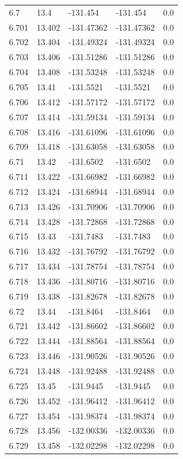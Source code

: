 \begin{tabular}{lllll}
6.7 & 13.4 & -131.454 & -131.454 & 0.0 \\
6.701 & 13.402 & -131.47362 & -131.47362 & 0.0 \\
6.702 & 13.404 & -131.49324 & -131.49324 & 0.0 \\
6.703 & 13.406 & -131.51286 & -131.51286 & 0.0 \\
6.704 & 13.408 & -131.53248 & -131.53248 & 0.0 \\
6.705 & 13.41 & -131.5521 & -131.5521 & 0.0 \\
6.706 & 13.412 & -131.57172 & -131.57172 & 0.0 \\
6.707 & 13.414 & -131.59134 & -131.59134 & 0.0 \\
6.708 & 13.416 & -131.61096 & -131.61096 & 0.0 \\
6.709 & 13.418 & -131.63058 & -131.63058 & 0.0 \\
6.71 & 13.42 & -131.6502 & -131.6502 & 0.0 \\
6.711 & 13.422 & -131.66982 & -131.66982 & 0.0 \\
6.712 & 13.424 & -131.68944 & -131.68944 & 0.0 \\
6.713 & 13.426 & -131.70906 & -131.70906 & 0.0 \\
6.714 & 13.428 & -131.72868 & -131.72868 & 0.0 \\
6.715 & 13.43 & -131.7483 & -131.7483 & 0.0 \\
6.716 & 13.432 & -131.76792 & -131.76792 & 0.0 \\
6.717 & 13.434 & -131.78754 & -131.78754 & 0.0 \\
6.718 & 13.436 & -131.80716 & -131.80716 & 0.0 \\
6.719 & 13.438 & -131.82678 & -131.82678 & 0.0 \\
6.72 & 13.44 & -131.8464 & -131.8464 & 0.0 \\
6.721 & 13.442 & -131.86602 & -131.86602 & 0.0 \\
6.722 & 13.444 & -131.88564 & -131.88564 & 0.0 \\
6.723 & 13.446 & -131.90526 & -131.90526 & 0.0 \\
6.724 & 13.448 & -131.92488 & -131.92488 & 0.0 \\
6.725 & 13.45 & -131.9445 & -131.9445 & 0.0 \\
6.726 & 13.452 & -131.96412 & -131.96412 & 0.0 \\
6.727 & 13.454 & -131.98374 & -131.98374 & 0.0 \\
6.728 & 13.456 & -132.00336 & -132.00336 & 0.0 \\
6.729 & 13.458 & -132.02298 & -132.02298 & 0.0 \\

\end{tabular}
